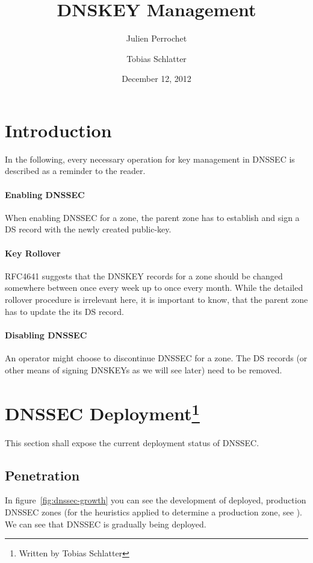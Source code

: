 \documentclass[a4paper]{scrartcl}
\title{DNSKEY Management}
\author{Julien Perrochet \and Tobias Schlatter}
\date{December 12, 2012}
\newcommand{\wbts}{\protect\footnote{Written by Tobias Schlatter}}
\begin{document}
\maketitle

\section{Introduction}

In the following, every necessary operation for key management in
DNSSEC is described as a reminder to the reader.

\paragraph{Enabling DNSSEC} When enabling DNSSEC for a zone, the
parent zone has to establish and sign a DS record with the newly
created public-key.

\paragraph{Key Rollover} RFC4641 \cite{RFC4641} suggests that the DNSKEY
records for a zone should be changed somewhere between once every week
up to once every month. While the detailed rollover procedure is
irrelevant here, it is important to know, that the parent zone has to
update the its DS record.

\paragraph{Disabling DNSSEC} An operator might choose to discontinue
DNSSEC for a zone. The DS records (or other means of signing DNSKEYs
as we will see later) need to be removed.

\section{DNSSEC Deployment\wbts}

This section shall expose the current deployment status of DNSSEC.

\subsection{Penetration}

In figure~\ref{fig:dnssec-growth} you can see the development of
deployed, production DNSSEC zones (for the heuristics applied to
determine a production zone, see \cite{secspider, Osterweil09}). We
can see that DNSSEC is gradually being deployed.
\end{document}
